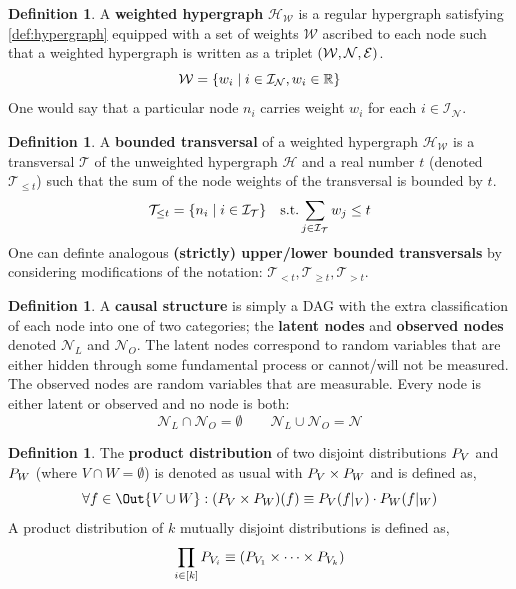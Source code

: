 \documentclass[aps, 10pt, english, twoside, pra, nofootinbib, longbibliography]{revtex4-1}
\theoremstyle{plain}
\theoremstyle{definition}
\newtheorem{definition}[theorem]{Definition}
\theoremstyle{remark}
\newcommand{\hgraph}{\mathcal{H}}
\newcommand{\nodes}{\mathcal{N}}
\newcommand{\weights}{\mathcal{W}}
\newcommand{\edges}{\mathcal{E}}
\newcommand{\trans}{\mathcal{T}}
\newcommand{\ind}{\mathcal{I}}
\newcommand{\term}[1]{\textcolor{Mahogany}{\textbf{#1}}}
\begin{document}
    \begin{definition}
        A \term{weighted hypergraph} $\hgraph_\weights$ is a regular hypergraph satisfying \cref{def:hypergraph} equipped with a set of weights $\weights$ ascribed to each node such that a weighted hypergraph is written as a triplet $\br{\weights, \nodes, \edges}$.
        \[ \weights = \bc{w_i \mid i \in \ind_\nodes, w_i \in \R} \]
        One would say that a particular node $n_i$ carries weight $w_i$ for each $i \in \ind_\nodes$.
    \end{definition}

    \begin{definition}
        A \term{bounded transversal} of a weighted hypergraph $\hgraph_\weights$ is a transversal $\trans$ of the unweighted hypergraph $\hgraph$ and a real number $t$ (denoted $\trans_{\leq t}$) such that the sum of the node weights of the transversal is bounded by $t$.
        \[ \trans_{\leq t} = \bc{n_i \mid i \in \ind_\trans} \quad \text{s.t.} \sum_{j\in\ind_\trans} w_j \leq t \]
        One can definte analogous \term{(strictly) upper/lower bounded transversals} by considering modifications of the notation: $\trans_{< t}, \trans_{\geq t}, \trans_{> t}$.
    \end{definition}

    \begin{definition}
        A \term{causal structure} is simply a DAG with the extra classification of each node into one of two categories; the \term{latent nodes} and \term{observed nodes} denoted $\nodes_L$ and $\nodes_O$. The latent nodes correspond to random variables that are either hidden through some fundamental process or cannot/will not be measured. The observed nodes are random variables that are measurable. Every node is either latent or observed and no node is both:
        \[ \nodes_L \cap \nodes_O = \emptyset \qquad \nodes_L \cup \nodes_O = \nodes \]
    \end{definition}

    \begin{definition}
        The \term{product distribution} of two disjoint distributions $\prob[V]$ and $\prob[W]$ (where $V \cap W = \emptyset$) is denoted as usual with $\prob[V] \times \prob[W]$ and is defined as,
        \[ \forall f \in \Out{V \cup W} : \br{\prob[V] \times \prob[W]}\br{f} \defined \prob[V][f|_{V}]\cdot\prob[W][f|_{W}] \]
        A product distribution of $k$ mutually disjoint distributions is defined as,
        \[ \prod_{i\in\bs{k}} \prob[V_i] \defined \br{\prob[V_1] \times \cdots \times \prob[V_k]} \]
    \end{definition}
\end{document}
